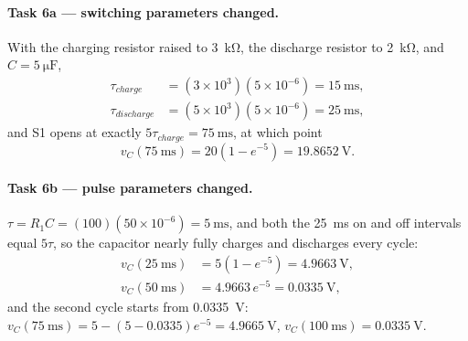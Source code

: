 \documentclass[12pt,a4paper]{article}
\begin{document}
	\paragraph{Task 6a --- switching parameters changed.}
	With the charging resistor raised to \SI{3}{\kilo\ohm}, the
	discharge resistor to \SI{2}{\kilo\ohm}, and
	$C = \SI{5}{\micro\farad}$,
	\begin{align}
		\tau_{charge} &= \left(3\times 10^{3}\right)\left(5\times 10^{-6}\right)
		= \SI{15}{\milli\second}, \\
		\tau_{discharge} &= \left(5\times 10^{3}\right)\left(5\times 10^{-6}\right)
		= \SI{25}{\milli\second},
	\end{align}
	and S1 opens at exactly $5\tau_{charge} =
	\SI{75}{\milli\second}$, at which point
	\begin{equation}
		v_C(\SI{75}{\milli\second}) = 20\left(1 - e^{-5}\right)
		= \SI{19.8652}{\volt}.
	\end{equation}
	
	\paragraph{Task 6b --- pulse parameters changed.}
	$\tau = R_1 C = (100)\left(50\times 10^{-6}\right) =
	\SI{5}{\milli\second}$, and both the \SI{25}{\milli\second} on and
	off intervals equal $5\tau$, so the capacitor nearly fully charges
	and discharges every cycle:
	\begin{align}
		v_C(\SI{25}{\milli\second}) &= 5\left(1 - e^{-5}\right)
		= \SI{4.9663}{\volt},\\
		v_C(\SI{50}{\milli\second}) &= 4.9663\, e^{-5} = \SI{0.0335}{\volt},
	\end{align}
	and the second cycle starts from \SI{0.0335}{\volt}:
	$v_C(\SI{75}{\milli\second}) = 5 - (5 - 0.0335)e^{-5} =
	\SI{4.9665}{\volt}$, $v_C(\SI{100}{\milli\second}) = \SI{0.0335}{\volt}$.
	
\end{document}
